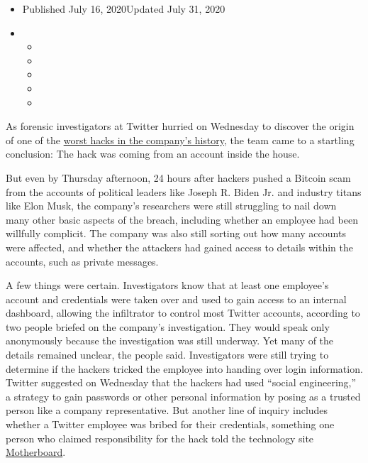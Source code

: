 \begin{itemize}
\item
  Published July 16, 2020Updated July 31, 2020
\item
  \begin{itemize}
  \item
  \item
  \item
  \item
  \item
  \end{itemize}
\end{itemize}

As forensic investigators at Twitter hurried on Wednesday to discover
the origin of one of the
\href{https://www.nytimes3xbfgragh.onion/2020/07/17/technology/twitter-hackers-interview.html}{worst
hacks in the company's history}, the team came to a startling
conclusion: The hack was coming from an account inside the house.

But even by Thursday afternoon, 24 hours after hackers pushed a Bitcoin
scam from the accounts of political leaders like Joseph R. Biden Jr. and
industry titans like Elon Musk, the company's researchers were still
struggling to nail down many other basic aspects of the breach,
including whether an employee had been willfully complicit. The company
was also still sorting out how many accounts were affected, and whether
the attackers had gained access to details within the accounts, such as
private messages.

A few things were certain. Investigators know that at least one
employee's account and credentials were taken over and used to gain
access to an internal dashboard, allowing the infiltrator to control
most Twitter accounts, according to two people briefed on the company's
investigation. They would speak only anonymously because the
investigation was still underway. Yet many of the details remained
unclear, the people said. Investigators were still trying to determine
if the hackers tricked the employee into handing over login information.
Twitter suggested on Wednesday that the hackers had used ``social
engineering,'' a strategy to gain passwords or other personal
information by posing as a trusted person like a company representative.
But another line of inquiry includes whether a Twitter employee was
bribed for their credentials, something one person who claimed
responsibility for the hack told the technology site
\href{https://www.vice.com/en_us/article/jgxd3d/twitter-insider-access-panel-account-hacks-biden-uber-bezos}{Motherboard}.

